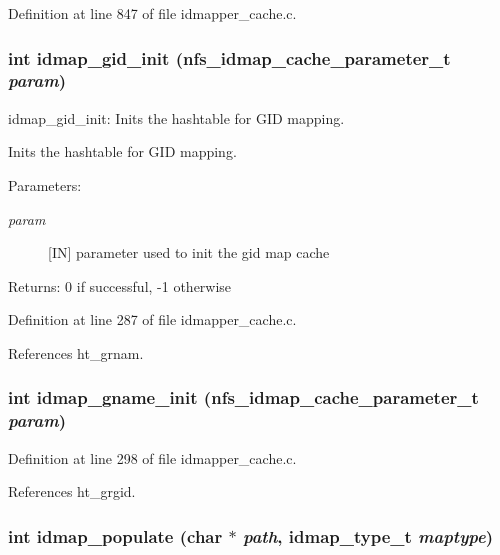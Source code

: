 Definition at line 847 of file idmapper\_\-cache.c.
\subsubsection{\setlength{\rightskip}{0pt plus 5cm}int idmap\_\-gid\_\-init (nfs\_\-idmap\_\-cache\_\-parameter\_\-t {\em param})}\label{idmapper__cache_8c_a16}


idmap\_\-gid\_\-init: Inits the hashtable for GID mapping.

Inits the hashtable for GID mapping.

\begin{Desc}
\item[Parameters:]
\begin{description}
\item[{\em param}][IN] parameter used to init the gid map cache\end{description}
\end{Desc}
\begin{Desc}
\item[Returns:]0 if successful, -1 otherwise \end{Desc}


Definition at line 287 of file idmapper\_\-cache.c.

References ht\_\-grnam.
\subsubsection{\setlength{\rightskip}{0pt plus 5cm}int idmap\_\-gname\_\-init (nfs\_\-idmap\_\-cache\_\-parameter\_\-t {\em param})}\label{idmapper__cache_8c_a17}




Definition at line 298 of file idmapper\_\-cache.c.

References ht\_\-grgid.
\subsubsection{\setlength{\rightskip}{0pt plus 5cm}int idmap\_\-populate (char $\ast$ {\em path}, idmap\_\-type\_\-t {\em maptype})}\label{idmapper__cache_8c_a37}



